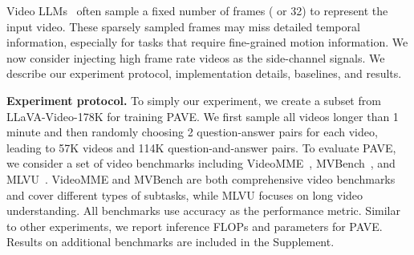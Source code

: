 Video LLMs~\cite{li2024llava,lin2023video} often sample a fixed number of frames ( or 32) to represent the input video. These sparsely sampled frames may miss detailed temporal information, especially for tasks that require fine-grained motion information. We now consider injecting high frame rate videos as the side-channel signals. We describe our experiment protocol, implementation details, baselines, and results.  


\medskip
\noindent\textbf{Experiment protocol.} To simply our experiment, we create a subset from LLaVA-Video-178K \cite{zhang2024videoinstructiontuningsynthetic} for training PAVE. We first sample all videos longer than 1 minute and then randomly choosing 2 question-answer pairs for each video, leading to 57K videos and 114K question-and-answer pairs. To evaluate PAVE, we consider a set of video benchmarks including VideoMME~\cite{fu2024video}, MVBench~\cite{li2023mvbench}, and MLVU~\cite{zhou2025mlvubenchmarkingmultitasklong}. VideoMME and MVBench are both comprehensive video benchmarks and cover different types of subtasks, while MLVU focuses on long video understanding.
All benchmarks use accuracy as the performance metric. Similar to other experiments, we report inference FLOPs and parameters for PAVE. Results on additional benchmarks are included in the Supplement.

